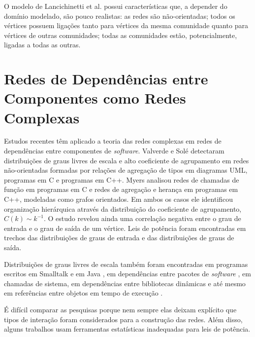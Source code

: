 \documentclass{article}
\begin{document}
O modelo de Lancichinetti et al. possui características que, a depender do domínio modelado, são pouco realistas: as redes são não-orientadas; todos os vértices possuem ligações tanto para vértices da mesma comunidade quanto para vértices de outras comunidades; todas as comunidades estão, potencialmente, ligadas a todas as outras.


\section{Redes de Dependências entre Componentes como Redes Complexas}

Estudos recentes têm aplicado a teoria das redes complexas em redes de dependências entre componentes de \textit{software}. Valverde e Solé \cite{Valverde2003} detectaram distribuições de graus livres de escala e alto coeficiente de agrupamento em redes não-orientadas formadas por relações de agregação de tipos em diagramas UML, programas em C e programas em C++. Myers \cite{Myers2003} analisou redes de chamadas de função em programas em C e redes de agregação e herança em programas em C++, modeladas como grafos orientados. Em ambos os casos ele identificou organização hierárquica através da distribuição do coeficiente de agrupamento, $C(k) \sim k^{-1}$. O estudo revelou ainda uma correlação negativa entre o grau de entrada e o grau de saída de um vértice. Leis de potência foram encontradas em trechos das distribuições de graus de entrada e das distribuições de graus de saída.

Distribuições de graus livres de escala também foram encontradas em programas escritos em Smalltalk \cite{Marchesi2004,Concas2007} e em Java \cite{Hyland-Wood2006,Baxter2006,Ichii2008}, em dependências entre pacotes de \textit{software} \cite{Labelle2004}, em chamadas de sistema, em dependências entre bibliotecas dinâmicas \cite{Louridas2008} e até mesmo em referências entre objetos em tempo de execução \cite{Potanin2005}.

É difícil comparar as pesquisas porque nem sempre elas deixam explícito que tipos de interação foram considerados para a construção das redes. Além disso, alguns trabalhos usam ferramentas estatísticas inadequadas para leis de potência.

\end{document}
